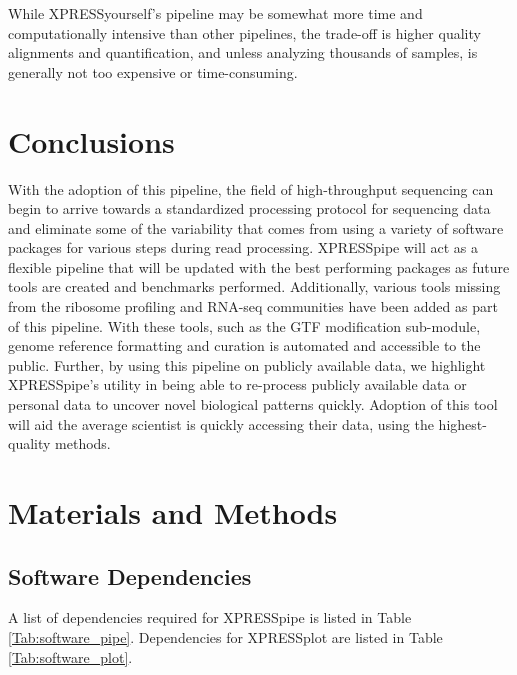 \documentclass[11pt, a4paper, oneside]{article}
\begin{document}
While XPRESSyourself's pipeline may be somewhat more time and computationally intensive than other pipelines, the trade-off is higher quality alignments and quantification, and unless analyzing thousands of samples, is generally not too expensive or time-consuming.


\section{Conclusions}
With the adoption of this pipeline, the field of high-throughput sequencing can begin to arrive towards a standardized processing protocol for sequencing data and eliminate some of the variability that comes from using a variety of software packages for various steps during read processing. XPRESSpipe will act as a flexible pipeline that will be updated with the best performing packages as future tools are created and benchmarks performed. Additionally, various tools missing from the ribosome profiling and RNA-seq communities have been added as part of this pipeline. With these tools, such as the GTF modification sub-module, genome reference formatting and curation is automated and accessible to the public. Further, by using this pipeline on publicly available data, we highlight XPRESSpipe's utility in being able to re-process publicly available data or personal data to uncover novel biological patterns quickly. Adoption of this tool will aid the average scientist is quickly accessing their data, using the highest-quality methods.


\section{Materials and Methods}

\subsection{Software Dependencies}
A list of dependencies required for XPRESSpipe is listed in Table \ref{Tab:software_pipe}. Dependencies for XPRESSplot are listed in Table \ref{Tab:software_plot}.
\end{document}
